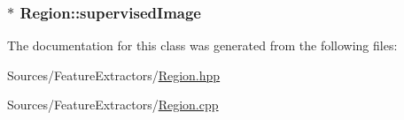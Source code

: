 \hypertarget{class_region_a897932b50cdd155984c06575726f9b69}{
\subsubsection[{supervised\+Image}]{$\ast$ Region\+::supervised\+Image\hspace{0.3cm}{\ttfamily [private]}}}\label{class_region_a897932b50cdd155984c06575726f9b69}


The documentation for this class was generated from the following files\+:\begin{DoxyCompactItemize}
\item 
Sources/\+Feature\+Extractors/\hyperlink{_region_8hpp}{Region.\+hpp}\item 
Sources/\+Feature\+Extractors/\hyperlink{_region_8cpp}{Region.\+cpp}\end{DoxyCompactItemize}
